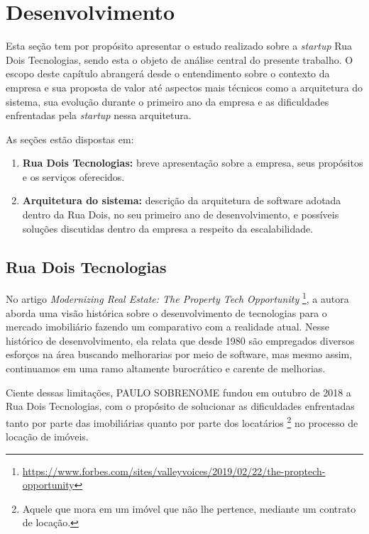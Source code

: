 \chapter{Desenvolvimento}

Esta seção tem por propósito apresentar o estudo realizado sobre a
\textit{startup} Rua Dois Tecnologias, sendo esta o objeto de análise
central do presente trabalho. O escopo deste capítulo abrangerá desde
o entendimento sobre o contexto da empresa e sua proposta de valor
até aspectos mais técnicos como a arquitetura do sistema, sua evolução
durante o primeiro ano da empresa e as dificuldades enfrentadas pela
\textit{startup} nessa arquitetura.

  As seções estão dispostas em:

  \begin{enumerate}
    \item \textbf{Rua Dois Tecnologias:} breve apresentação sobre a empresa,
      seus propósitos e os serviços oferecidos.
    \item \textbf{Arquitetura do sistema:} descrição da arquitetura de software
      adotada dentro da Rua Dois, no seu primeiro ano de desenvolvimento, e possíveis
      soluções discutidas dentro da empresa a respeito da escalabilidade.
  \end{enumerate}

\section{Rua Dois Tecnologias}

No artigo \textit{Modernizing Real Estate: The Property Tech Opportunity}
\footnote{\url{https://www.forbes.com/sites/valleyvoices/2019/02/22/the-proptech-opportunity}},
a autora  aborda uma visão histórica sobre o desenvolvimento
de tecnologias para o mercado imobiliário fazendo um comparativo com a realidade atual.
Nesse histórico de desenvolvimento, ela relata que desde 1980 são empregados
diversos esforços na área buscando melhorarias por meio de software, mas mesmo
assim, continuamos em uma ramo altamente burocrático e carente de melhorias.

Ciente dessas limitações, PAULO SOBRENOME fundou em outubro de 2018 a
Rua Dois Tecnologias, com o propósito de solucionar as dificuldades
enfrentadas tanto por parte das imobiliárias quanto por parte dos locatários
\footnote{Aquele que mora em um imóvel que não lhe pertence, mediante um
contrato de locação.} no processo de locação de imóveis.

